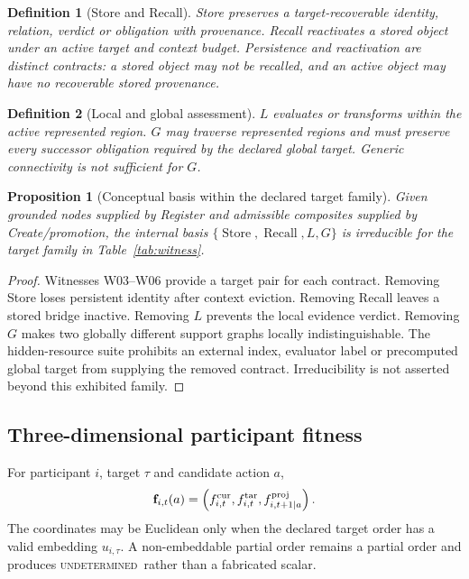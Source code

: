 \documentclass[10pt]{article}
\newtheorem{definition}{Definition}
\newtheorem{proposition}{Proposition}
\newcommand{\Store}{\operatorname{Store}}
\newcommand{\Recall}{\operatorname{Recall}}
\newcommand{\Und}{\textsc{undetermined}}
\begin{document}
\begin{definition}[Store and Recall]
Store preserves a target-recoverable identity, relation, verdict or obligation with provenance. Recall reactivates a stored object under an active target and context budget. Persistence and reactivation are distinct contracts: a stored object may not be recalled, and an active object may have no recoverable stored provenance.
\end{definition}

\begin{definition}[Local and global assessment]
$L$ evaluates or transforms within the active represented region. $G$ may traverse represented regions and must preserve every successor obligation required by the declared global target. Generic connectivity is not sufficient for $G$.
\end{definition}

\begin{proposition}[Conceptual basis within the declared target family]
Given grounded nodes supplied by Register and admissible composites supplied by Create/promotion, the internal basis $\{\Store,\Recall,L,G\}$ is irreducible for the target family in Table~\ref{tab:witness}.
\end{proposition}
\begin{proof}
Witnesses W03--W06 provide a target pair for each contract. Removing Store loses persistent identity after context eviction. Removing Recall leaves a stored bridge inactive. Removing $L$ prevents the local evidence verdict. Removing $G$ makes two globally different support graphs locally indistinguishable. The hidden-resource suite prohibits an external index, evaluator label or precomputed global target from supplying the removed contract. Irreducibility is not asserted beyond this exhibited family.
\end{proof}

\subsection{Three-dimensional participant fitness}
For participant $i$, target $\tau$ and candidate action $a$,
\begin{equation}
\mathbf f_{i,t}(a)=\left(f^{\rm cur}_{i,t},f^{\rm tar}_{i,t},f^{\rm proj}_{i,t+1\mid a}\right).
\end{equation}
The coordinates may be Euclidean only when the declared target order has a valid embedding $u_{i,\tau}$. A non-embeddable partial order remains a partial order and produces \Und\ rather than a fabricated scalar.
\end{document}
